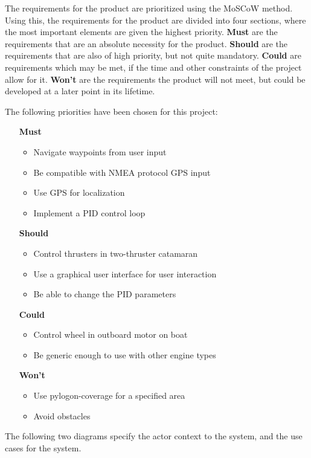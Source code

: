 The requirements for the product are prioritized using the MoSCoW method. Using this, the requirements for the product are divided into four sections, where the most important elements are given the highest priority. \textbf{Must} are the requirements that are an absolute necessity for the product. \textbf{Should} are the requirements that are also of high priority, but not quite mandatory. \textbf{Could} are requirements which may be met, if the time and other constraints of the project allow for it. \textbf{Won't} are the requirements the product will not meet, but could be developed at a later point in its lifetime.  

\noindent The following priorities have been chosen for this project:
\begin{itemize}
	\item[\textbf{Must}]
		\begin{itemize}
			\item Navigate waypoints from user input
			\item Be compatible with NMEA protocol GPS input
			\item Use GPS for localization
			\item Implement a PID control loop
		\end{itemize}
	\item[\textbf{Should}]
		\begin{itemize}
			\item Control thrusters in two-thruster catamaran
			\item Use a graphical user interface for user interaction
			\item Be able to change the PID parameters
		\end{itemize}
	\item[\textbf{Could}] 
		\begin{itemize}
			\item Control wheel in outboard motor on boat
			\item Be generic enough to use with other engine types
		\end{itemize}
	\item[\textbf{Won't}]
		\begin{itemize}
			\item Use pylogon-coverage for a specified area
			\item Avoid obstacles
		\end{itemize}
\end{itemize}

The following two diagrams specify the actor context to the system, and the use cases for the system.

